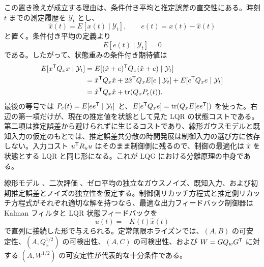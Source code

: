 この置き換えが成立する理由は、条件付き平均と推定誤差の直交性にある。時刻 $t$ までの測定履歴を $\mathcal{Y}_t$ とし、
\begin{equation}
  \hat{x}(t)=E[x(t)\mid\mathcal{Y}_t],
  \qquad
  e(t)=x(t)-\hat{x}(t)
\end{equation}
と置く。条件付き平均の定義より
\begin{equation}
  E[e(t)\mid\mathcal{Y}_t]=0
\end{equation}
である。したがって、状態重みの条件付き期待値は
\begin{align}
  E[x^{\mathsf{T}} Q_x x\mid\mathcal{Y}_t]
  &=
  E[(\hat{x}+e)^{\mathsf{T}} Q_x(\hat{x}+e)\mid\mathcal{Y}_t]\\
  &=
  \hat{x}^{\mathsf{T}} Q_x\hat{x}
  +2\hat{x}^{\mathsf{T}} Q_x E[e\mid\mathcal{Y}_t]
  +E[e^{\mathsf{T}} Q_x e\mid\mathcal{Y}_t]\\
  &=
  \hat{x}^{\mathsf{T}} Q_x\hat{x}
  +\operatorname{tr}(Q_xP_e(t)).
  \label{eq:lqg-cost-decomposition}
\end{align}
最後の等号では $P_e(t)=E[ee^{\mathsf{T}}\mid\mathcal{Y}_t]$ と、$E[e^{\mathsf{T}} Q_x e]=\operatorname{tr}(Q_x E[ee^{\mathsf{T}}])$ を使った。右辺の第一項だけが、現在の推定値を状態として見た LQR の状態コストである。第二項は推定誤差から避けられずに生じるコストであり、線形ガウスモデルと既知入力の仮定のもとでは、推定誤差共分散の時間発展は制御入力の選び方に依存しない。入力コスト $u^{\mathsf{T}} R_u u$ はそのまま制御側に残るので、制御の最適化は $\hat{x}$ を状態とする LQR と同じ形になる。これが LQG における分離原理の中身である。

\begin{theorem}
線形モデル 、二次評価 、ゼロ平均の独立なガウスノイズ、既知入力、および初期推定誤差とノイズの独立性を仮定する。制御側リカッチ方程式と推定側リカッチ方程式がそれぞれ適切な解を持つなら、最適な出力フィードバック制御器は Kalman フィルタと LQR 状態フィードバックを
\begin{equation}
  u(t)=-K(t)\hat{x}(t)
\end{equation}
で直列に接続した形で与えられる。定常無限ホライズンでは、$(A,B)$ の可安定性、$(A,Q_x^{1/2})$ の可検出性、$(A,C)$ の可検出性、および $W=GQ_wG^{\mathsf{T}}$ に対する $(A,W^{1/2})$ の可安定性が代表的な十分条件である。
\end{theorem}

